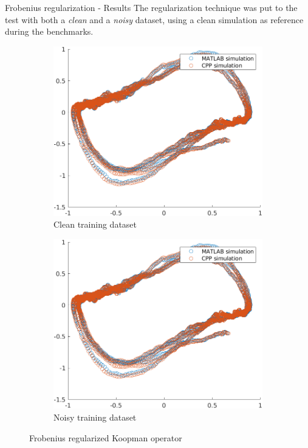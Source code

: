 \documentclass{beamer}
\begin{document}
\begin{frame}{Frobenius regularization - Results}
    The regularization technique was put to the test with both a \textit{clean} and a \textit{noisy} dataset, using a clean simulation as reference during the benchmarks.

    \begin{figure}
        \centering
        \begin{subfigure}[b]{0.45\textwidth}
            \centering
            \includegraphics[width=\textwidth]{Cpp_Sim.png}
            \caption{Clean training dataset}
            \label{fig:Koopman_clean}
        \end{subfigure}
        \hfill
        \begin{subfigure}[b]{0.45\textwidth}
            \centering
            \includegraphics[width=\textwidth]{Cpp_Sim.png}
            \caption{Noisy training dataset}
            \label{fig:Koopman_noisy}
        \end{subfigure}
        \caption{Frobenius regularized Koopman operator}
        \label{fig:Koopman_Frobenius}
    \end{figure}
\end{frame}
\end{document}
